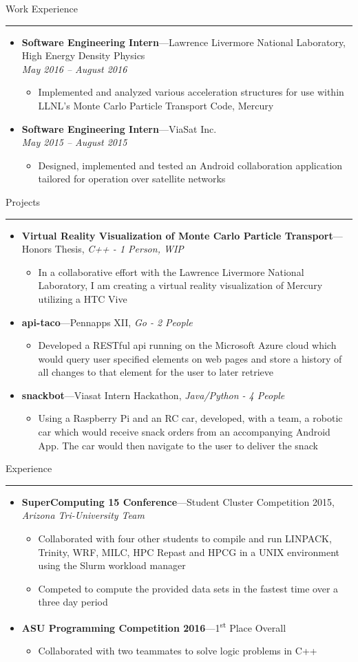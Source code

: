 \documentclass[10pt,oneside]{article}
\newcommand{\sectitle}[1]{
	\begin{flushleft}{\fontfamily{phv}\selectfont\Large#1}\end{flushleft}
}
\newenvironment{ressection}[1]{
	\vspace{2pt}
	\sectitle{#1}
	\vspace{-10pt}\rule{\textwidth}{0.5pt}
	\vspace{-10pt}
	\begin{itemize}
	\vspace{3pt}
}{
	\end{itemize}
}
\newcommand{\ressubitem}[1]{
	\vspace{-1pt}
	\item \begin{flushleft} #1 \end{flushleft}
}
\newcommand{\resmeditem}[2]{
	\vspace{-5pt}
	\item
	\textbf{#1}---#2
}
\newcommand{\resbigitemline}[3]{
	\vspace{-5pt}
	\item
	\textbf{#1}---#2, 
	\textit{#3}
}
\newcommand{\resbigitem}[3]{
	\vspace{-5pt}
	\item
	\textbf{#1}---#2 \\
	\textit{#3}
}
\newenvironment{ressubsec}[3]{
	\resbigitem{#1}{#2}{#3}
	\vspace{-4pt}
	\begin{itemize}
}{
	\end{itemize}
}
\newenvironment{ressubsecshort}[2]{
	\resmeditem{#1}{#2}
	\vspace{-4pt}
	\begin{itemize}
	}{
	\end{itemize}
}
\newenvironment{ressubsecline}[3]{
	\resbigitemline{#1}{#2}{#3}
	\vspace{-2pt}
	\begin{itemize}
}{
	\end{itemize}
}
\begin{document}
\begin{ressection}{Work Experience}
	\begin{ressubsec}{Software Engineering Intern}{Lawrence Livermore National Laboratory, High Energy Density Physics}{May 2016 -- August 2016}
    \ressubitem{Implemented and analyzed various acceleration structures for use within LLNL's Monte Carlo Particle Transport Code, Mercury}
  \end{ressubsec}
	
  \begin{ressubsec}{Software Engineering Intern}{ViaSat Inc.}{May 2015 -- August 2015}
    \ressubitem{Designed, implemented and tested an Android collaboration application tailored for operation over satellite networks}
  \end{ressubsec}

\end{ressection}

\begin{ressection}{Projects}
	\begin{ressubsecline}{Virtual Reality Visualization of Monte Carlo Particle Transport}{Honors Thesis}{C++ - 1 Person, WIP}
		\ressubitem{In a collaborative effort with the Lawrence Livermore National Laboratory, I am creating a virtual reality visualization of Mercury utilizing a HTC Vive}
	\end{ressubsecline}
	\begin{ressubsecline}{api-taco}{Pennapps XII}{Go - 2 People}
		\ressubitem{Developed a RESTful api running on the Microsoft Azure cloud which would query user specified
		elements on web pages and store a history of all changes to that element for the user to later retrieve}
	\end{ressubsecline}
	\begin{ressubsecline}{snackbot}{Viasat Intern Hackathon}{Java/Python - 4 People}
		\ressubitem{Using a Raspberry Pi and an RC car, developed, with a team, a robotic car which would receive snack
		orders from an accompanying Android App. The car would then navigate to the user to deliver the snack}
	\end{ressubsecline}
\end{ressection}

\begin{ressection}{Experience}
	\begin{ressubsecline}{SuperComputing 15 Conference}{Student Cluster Competition 2015}{Arizona Tri-University Team}
		\ressubitem{Collaborated with four other students to compile and run LINPACK, Trinity, WRF, MILC, HPC Repast and
		HPCG in a UNIX environment using the Slurm workload manager}
	\ressubitem{Competed to compute the provided data sets in the fastest time over a three day period}
	\end{ressubsecline}
	\begin{ressubsecshort}{ASU Programming Competition 2016}{1\textsuperscript{st} Place Overall}
		\ressubitem{Collaborated with two teammates to solve logic problems in C++}
	\end{ressubsecshort}
\end{ressection}
\end{document}
